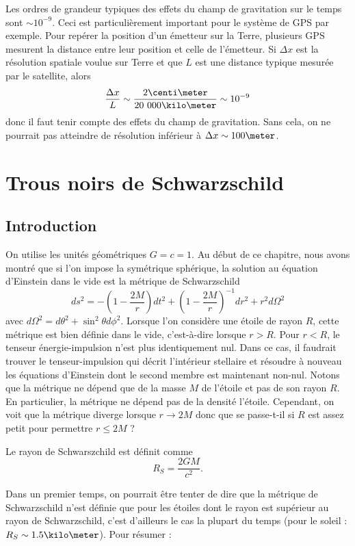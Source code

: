 \documentclass[a4paper,11pt]{report}
\begin{document}
        Les ordres de grandeur typiques des effets du champ de gravitation sur le temps sont $\sim10^{-9}$. Ceci est particulièrement important pour le système de GPS par exemple. Pour repérer la position d'un émetteur sur la Terre, plusieurs GPS mesurent la distance entre leur position et celle de l'émetteur. Si $\Delta x$ est la résolution spatiale voulue sur Terre et que $L$ est une distance typique mesurée par le satellite, alors
        \begin{equation}
            \frac{\Delta x}{L}\sim\frac{2\centi\meter}{20~000\kilo\meter}\sim10^{-9}
        \end{equation}
        donc il faut tenir compte des effets du champ de gravitation. Sans cela, on ne pourrait pas atteindre de résolution inférieur à $\Delta x\sim100\meter$.
        
    \section{Trous noirs de Schwarzschild}
    
        \subsection{Introduction}
    
            On utilise les unités géométriques $G = c = 1$. Au début de ce chapitre, nous avons montré que si l'on impose la symétrique sphérique, la solution au équation d'Einstein dans le vide est la métrique de Schwarzschild
            \begin{equation}
                ds^2 = -\left( 1-\frac{2M}{r} \right)dt^2 + \left( 1-\frac{2M}{r} \right)^{-1}dr^2 + r^2d\Omega^2
            \end{equation}
            avec $d\Omega^2 = d\theta^2+\sin^2\theta d\phi^2$. Lorsque l'on considère une étoile de rayon $R$, cette métrique est bien définie dans le vide, c'est-à-dire lorsque $r>R$. Pour $r<R$, le tenseur énergie-impulsion n'est plus identiquement nul. Dans ce cas, il faudrait trouver le tenseur-impulsion qui décrit l'intérieur stellaire et résoudre à nouveau les équations d'Einstein dont le second membre est maintenant non-nul. Notons que la métrique ne dépend que de la masse $M$ de l'étoile et pas de son rayon $R$. En particulier, la métrique ne dépend pas de la densité l'étoile. Cependant, on voit que la métrique diverge lorsque $r\to2M$ donc que se passe-t-il si $R$ est assez petit pour permettre $r\leq2M$ ? 
            \begin{definition}
                Le rayon de Schwarszchild est définit comme  
                \begin{equation}
                    R_S =\frac{2GM}{c^2}.
                \end{equation}
            \end{definition}
            Dans un premier temps, on pourrait être tenter de dire que la métrique de Schwarzschild n'est définie que pour les étoiles dont le rayon est supérieur au rayon de Schwarzschild, c'est d'ailleurs le cas la plupart du temps (pour le soleil : $R_S\sim 1.5\kilo\meter$). Pour résumer :
            
\end{document}
